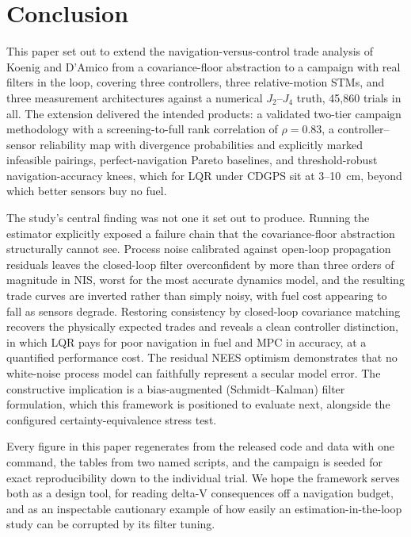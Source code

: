 \section{Conclusion}\label{sec:conclusion}

This paper set out to extend the navigation-versus-control trade analysis
of Koenig and D'Amico \cite{koenig2018tradeoffs} from a covariance-floor
abstraction to a campaign with real filters in the loop, covering three
controllers, three relative-motion STMs, and three measurement architectures
against a numerical $J_2$--$J_4$ truth, 45{,}860 trials in all. The
extension delivered the intended products: a validated two-tier campaign
methodology with a screening-to-full rank correlation of $\rho = 0.83$, a
controller--sensor reliability map with divergence probabilities and
explicitly marked infeasible pairings, perfect-navigation Pareto baselines,
and threshold-robust navigation-accuracy knees, which for LQR under CDGPS
sit at 3--10~cm, beyond which better sensors buy no fuel.

The study's central finding was not one it set out to produce. Running the
estimator explicitly exposed a failure chain that the covariance-floor
abstraction structurally cannot see. Process noise calibrated against
open-loop propagation residuals leaves the closed-loop filter overconfident
by more than three orders of magnitude in NIS, worst for the most accurate
dynamics model, and the resulting trade curves are
inverted rather than simply noisy, with fuel cost appearing to fall as
sensors degrade. Restoring
consistency by closed-loop covariance matching recovers the physically
expected trades and reveals a clean controller distinction, in which LQR
pays for poor navigation in fuel and MPC in accuracy, at a quantified
performance cost. The residual NEES optimism demonstrates that no
white-noise process model can faithfully represent a secular model error.
The constructive implication is a bias-augmented (Schmidt--Kalman) filter
formulation, which this framework is positioned to evaluate next, alongside
the configured certainty-equivalence stress test.

Every figure in this paper regenerates from the released code and data with
one command, the tables from two named scripts, and the campaign is seeded
for exact reproducibility down to the individual trial. We hope the
framework serves both as a design tool, for reading delta-V consequences off
a navigation budget, and as an inspectable cautionary example of how easily
an estimation-in-the-loop study can be corrupted by its filter tuning.
